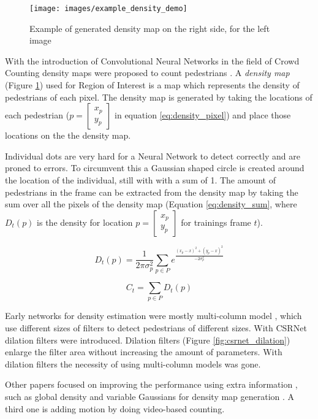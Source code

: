 \begin{figure}[h]
\centering
\texttt{[image: images/example\_density\_demo]}
\caption{Example of generated density map on the right side, for the left image}
\label{fig:density_map}
\end{figure}
With the introduction of Convolutional Neural Networks in the field of Crowd Counting density maps were proposed to count pedestrians \cite{Zhang2016, Liu2019, li2018csrnet}. A \emph{density map} (Figure \ref{fig:density_map}) used for Region of Interest is a map which represents the density of pedestrians of each pixel. The density map is generated by taking the locations of each pedestrian ($p=\begin{bmatrix} x_p \\ y_p \end{bmatrix}$ in equation \ref{eq:density_pixel}) and place those locations on the the density map.

Individual dots are very hard for a Neural Network to detect correctly and are proned to errors. To circumvent this a Gaussian shaped circle is created around the location of the individual, still with with a sum of 1. The amount of pedestrians in the frame can be extracted from the density map by taking the sum over all the pixels of the density map (Equation \ref{eq:density_sum}, where $D_t(p)$ is the density for location $p=\begin{bmatrix} x_p \\ y_p \end{bmatrix}$ for trainings frame $t$).

\begin{equation}
\label{eq:density_pixel}
	D_t(p) = \frac{1}{2 \pi \sigma_p^2}\sum_{p\in P} e^{\frac{(x_p-x)^2+(y_p-x)^2}{-2 \sigma_p^2}}
\end{equation}

\begin{equation}
	\label{eq:density_sum}
	C_t = \sum_{p\in P} D_t(p)
\end{equation}

Early networks for density estimation were mostly multi-column model \cite{Zhang2016}, which use different sizes of filters to detect pedestrians of different sizes. With CSRNet \cite{li2018csrnet} dilation filters were introduced. Dilation filters (Figure \ref{fig:csrnet_dilation}) enlarge the filter area without increasing the amount of parameters. With dilation filters the necessity of using multi-column models was gone.

Other papers focused on improving the performance using extra information \cite{Shi_2018_CVPR, shi2019counting, Liu2019}, such as global density \cite{shi2019counting} and variable Gaussians for density map generation \cite{Zhang2016, li2018csrnet, Wan2019}. A third one is adding motion by doing video-based counting.


